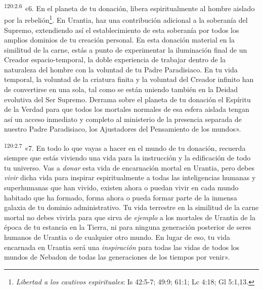 \par 
\textsuperscript{120:2.6} «6. En el planeta de tu donación, libera espiritualmente al hombre aislado por la rebelión\footnote{\textit{Libertad a los cautivos espirituales}: Is 42:5-7; 49:9; 61:1; Lc 4:18; Gl 5:1,13.}. En Urantia, haz una contribución adicional a la soberanía del Supremo, extendiendo así el establecimiento de esta soberanía por todos los amplios dominios de tu creación personal. En esta donación material en la similitud de la carne, estás a punto de experimentar la iluminación final de un Creador espacio-temporal, la doble experiencia de trabajar dentro de la naturaleza del hombre con la voluntad de tu Padre Paradisiaco. En tu vida temporal, la voluntad de la criatura finita y la voluntad del Creador infinito han de convertirse en una sola, tal como se están uniendo también en la Deidad evolutiva del Ser Supremo. Derrama sobre el planeta de tu donación el Espíritu de la Verdad para que todos los mortales normales de esa esfera aislada tengan así un acceso inmediato y completo al ministerio de la presencia separada de nuestro Padre Paradisiaco, los Ajustadores del Pensamiento de los mundos».

\par 
\textsuperscript{120:2.7} «7. En todo lo que vayas a hacer en el mundo de tu donación, recuerda siempre que estás viviendo una vida para la instrucción y la edificación de todo tu universo. Vas a \textit{donar} esta vida de encarnación mortal en Urantia, pero debes \textit{vivir} dicha vida para inspirar espiritualmente a todas las inteligencias humanas y superhumanas que han vivido, existen ahora o puedan vivir en cada mundo habitado que ha formado, forma ahora o pueda formar parte de la inmensa galaxia de tu dominio administrativo. Tu vida terrestre en la similitud de la carne mortal no debes vivirla para que sirva de \textit{ejemplo} a los mortales de Urantia de la época de tu estancia en la Tierra, ni para ninguna generación posterior de seres humanos de Urantia o de cualquier otro mundo. En lugar de eso, tu vida encarnada en Urantia será una \textit{inspiración} para todas las vidas de todos los mundos de Nebadon de todas las generaciones de los tiempos por venir».

